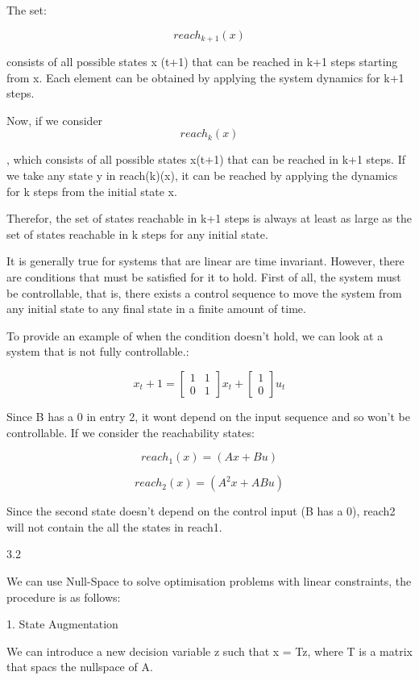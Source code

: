 \documentclass{article}
\begin{document}
The set:

\[ reach_{k+1} (x) \] 

consists of all possible states x (t+1) that can be reached in k+1 steps starting from x. Each element can be obtained by applying the system dynamics for k+1 steps.

Now, if we consider
\[ reach_{k} (x)\] 

, which consists of all possible states x(t+1) that can be reached in k+1 steps. If we take any state y in reach(k)(x), it can be reached by applying the dynamics for k steps from the initial state x.  

Therefor, the set of states reachable in k+1 steps is always at least as large as the set of states reachable in k steps for any initial state.


It is generally true for systems that are linear are time invariant. However, there are conditions that must be satisfied for it to hold. First of all, the system must be controllable, that is, there exists a control sequence to move the system from any initial state to any final state in a finite amount of time. 

To provide an example of when the condition doesn't hold, we can look at a system that is not fully controllable.:

\[ x_t+1 = \begin{bmatrix}
1 & 1 \\
0 & 1
\end{bmatrix} x_t + \begin{bmatrix}
1 \\
0
\end{bmatrix} u_t \]

Since B has a 0 in entry 2, it wont depend on the input sequence and so won't be controllable. If we consider the reachability states:


\[ reach_1 (x) = (Ax + Bu) \]

\[ reach_2 (x) = (A^2x + A Bu) \]

Since the second state doesn't depend on the control input (B has a 0), reach2 will not contain the all the states in reach1.



3.2

We can use Null-Space to solve optimisation problems with linear constraints, the procedure is as follows:

1. State Augmentation

We can introduce a new decision variable z such that x = Tz, where T is a matrix that spacs the nullspace of A.
\end{document}
